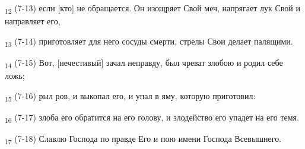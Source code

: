 \begin{tcolorbox}
\textsubscript{12} (7-13) если [кто] не обращается. Он изощряет Свой меч, напрягает лук Свой и направляет его,
\end{tcolorbox}
\begin{tcolorbox}
\textsubscript{13} (7-14) приготовляет для него сосуды смерти, стрелы Свои делает палящими.
\end{tcolorbox}
\begin{tcolorbox}
\textsubscript{14} (7-15) Вот, [нечестивый] зачал неправду, был чреват злобою и родил себе ложь;
\end{tcolorbox}
\begin{tcolorbox}
\textsubscript{15} (7-16) рыл ров, и выкопал его, и упал в яму, которую приготовил:
\end{tcolorbox}
\begin{tcolorbox}
\textsubscript{16} (7-17) злоба его обратится на его голову, и злодейство его упадет на его темя.
\end{tcolorbox}
\begin{tcolorbox}
\textsubscript{17} (7-18) Славлю Господа по правде Его и пою имени Господа Всевышнего.
\end{tcolorbox}
